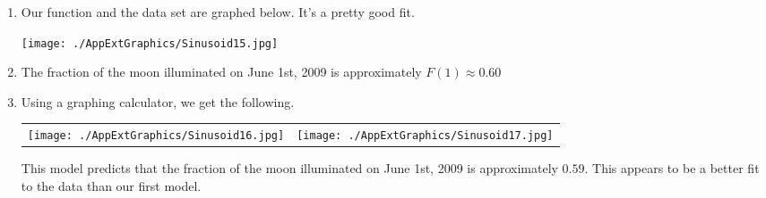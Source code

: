 \begin{enumerate}
\begin{enumerate}
\enlargethispage{\baselineskip}

\item  Our function and the data set are graphed below.  It's a pretty good fit.

\begin{center}

 \texttt{[image: ./AppExtGraphics/Sinusoid15.jpg]} 
 
 \end{center}

\item  The fraction of the moon illuminated on June 1st, 2009 is approximately $F(1) \approx 0.60$


\item  Using a graphing calculator, we get the following.

\begin{center}

\begin{tabular}{cc}

\texttt{[image: ./AppExtGraphics/Sinusoid16.jpg]} &
\hspace{0.75in}  \texttt{[image: ./AppExtGraphics/Sinusoid17.jpg]}  \\

\end{tabular}

\end{center}

This model predicts that the fraction of the moon illuminated on June 1st, 2009 is approximately $0.59$.  This appears to be a better fit to the data than our first model.

\end{enumerate}


\end{enumerate}

\closegraphsfile
